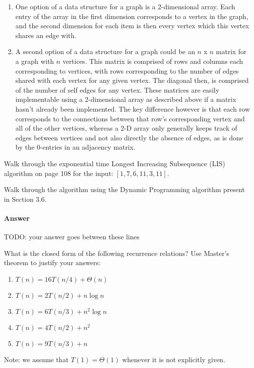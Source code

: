 \documentclass{article}
\begin{document}
\begin{enumerate}
	\item
		One option of a data structure for a graph is a 2-dimensional array. Each entry of the array in the first
		dimension corresponds to a vertex in the graph, and the second dimension for each item is then every vertex
		which this vertex shares an edge with.
	\item
		A second option of a data structure for a graph could be an $n$ x $n$ matrix for a graph with $n$ vertices.
		This matrix is comprised of rows and columns each corresponding to vertices, with rows corresponding to the
		number of edges shared with each vertex for any given vertex. The diagonal then, is comprised of the number
		of self edges for any vertex. These matrices are easily implementable using a 2-dimensional array as
		described above if a matrix hasn't already been implemented. The key difference however is that each row
		corresponds to the connections between that row's corresponding vertex and all of the other vertices, whereas
		a 2-D array only generally keeps track of edges between vertices and not also directly the absence of edges,
		as is done by the 0-entries in an adjacency matrix.
\end{enumerate}



\nextprob
{}

Walk through the exponential time Longest Increasing Subsequence (LIS) algorithm
on page 108 for the input: $\left[ 1, 7, 6, 11, 3, 11 \right]$.

Walk through the algorithm using the Dynamic Programming algorithm present in
Section 3.6.

\paragraph{Answer}


TODO: your answer goes between these lines


\nextprob
{}

What is the closed form of the following recurrence relations?  Use Master's
theorem to justify your answers:
\begin{enumerate}
    \item $T(n) = 16 T(n/4) + \Theta(n)$
    \item $T(n) = 2 T(n/2) + n \log{n}$
    \item $T(n) = 6 T(n/3) + n^2 \log{n}$
    \item $T(n) = 4 T(n/2) + n^2$
    \item $T(n) = 9 T(n/3) + n$
\end{enumerate}
Note: we assume that $T(1)=\Theta(1)$ whenever it is not explicitly given.
\end{document}
